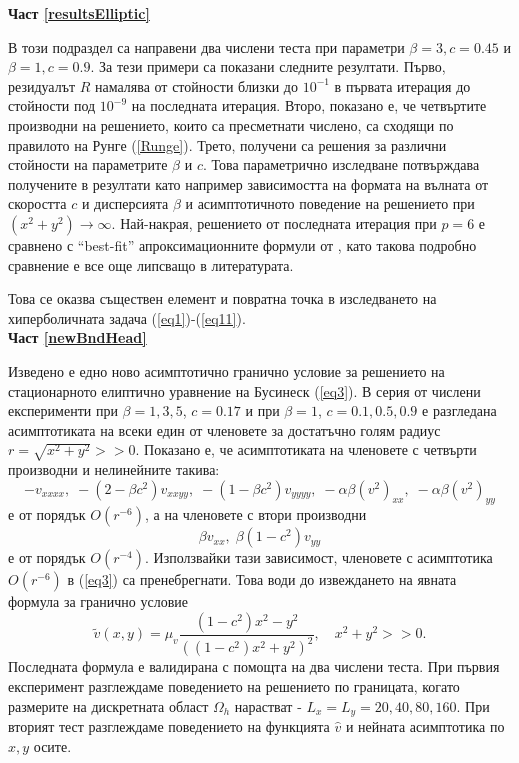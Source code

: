 \documentclass[a4paper]{article}
\newcommand{\be}{\begin{equation}}
\newcommand{\ee}{\end{equation}}
\newcommand{\rf}[1]{(\ref{#1})}
\theoremstyle{remark}
\begin{document}
\begin{large}
\textbf{Част \ref{resultsElliptic}}

В този подраздел са направени два числени теста при параметри $\beta = 3, c=0.45$ и $\beta = 1, c=0.9$. За тези примери са показани следните резултати. Първо, резидуалът $R$ намалява от стойности близки до $10^{-1}$ в първата итерация до стойности под $10^{-9}$ на последната итерация. Второ, показано е, че четвъртите производни на решението, които са пресметнати числено, са сходящи по правилото на Рунге \rf{Runge}. Трето, получени са решения за различни стойности на параметрите $\beta$ и $c$. Това параметрично изследване потвърждава получените в \cite{ref15,ref117, ref116} резултати като например зависимостта на формата на вълната от скоростта $c$ и дисперсията $\beta$ и асимптотичното поведение на решението при $(x^2 + y^2) \rightarrow \infty$. Най-накрая, решението от последната итерация при $p=6$ е сравнено с ``best-fit'' апроксимационните формули от \cite{ref15}, като такова подробно сравнение е все още липсващо в литературата. 

Това се оказва съществен елемент и повратна точка в изследването на хиперболичната задача \rf{eq1}-\rf{eq11}. \\

\textbf{Част \ref{newBndHead}}

Изведено е едно ново асимптотично гранично условие за решението на стационарното елиптично уравнение на Бусинеск \rf{eq3}. В серия от числени експерименти при $\beta=1,3,5$, $c=0.17$ и при $\beta=1$, $c=0.1, 0.5, 0.9$ е разгледана асимптотиката на всеки един от членовете за достатъчно голям радиус $r=\sqrt{x^2 + y^2} >> 0$. Показано е, че асимптотиката на членовете с четвърти производни и нелинейните такива: 
$$- v_{xxxx}, \;  - (2-\beta c^2)v_{xxyy},  \;  - (1-\beta c^2)v_{yyyy}, \;  - \alpha \beta (v^2)_{xx}, \; - \alpha \beta (v^2)_{yy}$$
е от порядък $O(r^{-6})$, а на членовете с втори производни 
$$\beta v_{xx}, \; \beta (1-c^2) v_{yy}$$
 е от порядък $O(r^{-4})$. Използвайки тази зависимост, членовете с асимптотика $O(r^{-6})$ в \rf{eq3} са пренебрегнати. Това води до извеждането на явната формула за гранично условие
\be
\tilde v(x, y) = \mu_v \frac{ (1-c^2) x^2 - y^2 }{ ((1-c^2) x^2 + y^2)^2 }, \quad x^2+y^2 >> 0.
\ee
Последната формула е валидирана с помощта на два числени теста. При първия експеримент разглеждаме поведението на решението по границата, когато размерите на дискретната област $\Omega_h$ нарастват - $L_x = L_y = 20, 40, 80, 160$. При вторият тест разглеждаме поведението на функцията $\widehat v$ и нейната асимптотика по $x,y$ осите.\\


\end{large}
\end{document}
